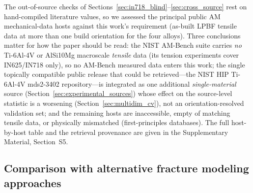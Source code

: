 The out-of-source checks of Sections~\ref{sec:in718_blind}--\ref{sec:cross_source} rest on hand-compiled literature values, so we assessed the principal public AM mechanical-data hosts against this work's requirement (as-built LPBF tensile data at more than one build orientation for the four alloys). Three conclusions matter for how the paper should be read: the NIST AM-Bench suite carries \emph{no} Ti-6Al-4V or AlSi10Mg macroscale \emph{tensile} data (its tension experiments cover IN625/IN718 only), so no AM-Bench measured data enters this work; the single topically compatible public release that could be retrieved---the NIST HIP Ti-6Al-4V mds2-3402 repository---is integrated as one additional \emph{single-material} source (Section~\ref{sec:experimental_sources}) whose effect on the source-level statistic is a worsening (Section~\ref{sec:multidim_cv}), not an orientation-resolved validation set; and the remaining hosts are inaccessible, empty of matching tensile data, or physically mismatched (first-principles databases). The full host-by-host table and the retrieval provenance are given in the Supplementary Material, Section~S5.

\subsection{Comparison with alternative fracture modeling approaches}

